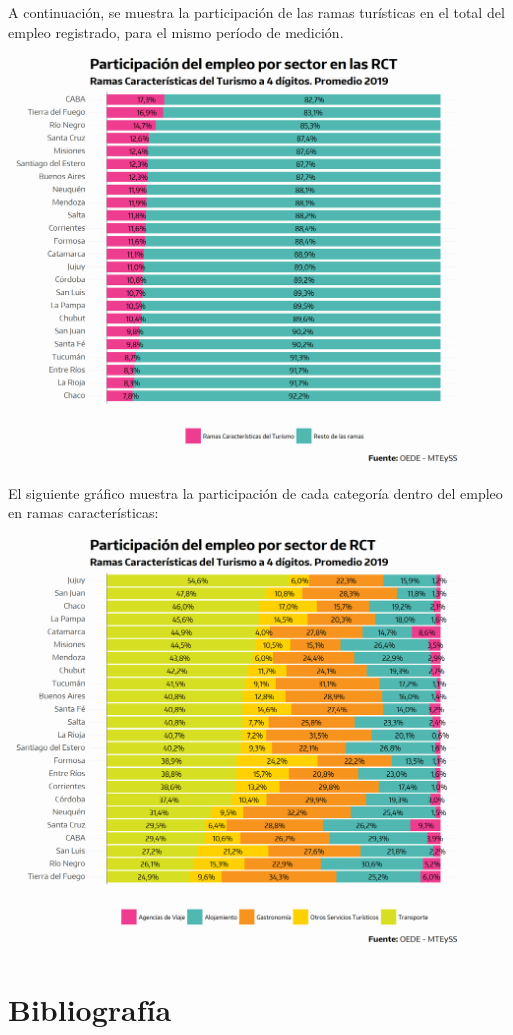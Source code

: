 \documentclass[
  openany]{book}
\begin{document}
A continuación, se muestra la participación de las ramas turísticas en el total del empleo registrado, para el mismo período de medición.

\begin{center}\includegraphics[width=1\linewidth]{imagenes/empleo.prov.part} \end{center}

El siguiente gráfico muestra la participación de cada categoría dentro del empleo en ramas características:

\begin{center}\includegraphics[width=1\linewidth]{imagenes/empleo.prov.part.agrup} \end{center}

\hypertarget{bibliografuxeda}{%
\chapter*{\texorpdfstring{\textbf{Bibliografía}}{Bibliografía}}\label{bibliografuxeda}}

  
\end{document}
